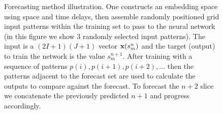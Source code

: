 \documentclass[journal]{IEEEtran}
\begin{document}
\begin{figure}
\centering
{}
\caption{Forecasting method illustration. One constructs an embedding space using
space and time delays, then assemble randomly positioned grid input patterns within the training set to pass to the neural network (in this figure
we show 3 randomly selected input patterns).
The input is a
$(2 I+1)(J+1)$ vector ${\bf x}(s^n_m)$ and the target (output) to train the network is the value $s^{n+1}_{m}$.
After training with a sequence
of patterns $p(i), p(i+1), p(i+2), \ldots$ then the patterns adjacent to the forecast set are used to calculate the outputs
to compare against the forecast. To forecast the $n+2$ slice we concatenate the previously predicted $n+1$ and progress accordingly.}
\label{NeuralNetwork}
\end{figure}
\end{document}
